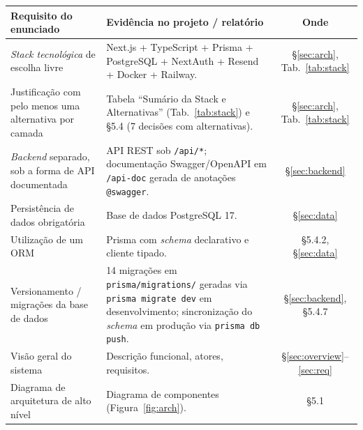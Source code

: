 \documentclass[11pt,a4paper]{article}
\begin{document}
\begin{table}[H]
    \centering
    \footnotesize
    \renewcommand{\arraystretch}{1.3}
    \begin{tabularx}{\linewidth}{@{}p{4.2cm}Xc@{}}
        \toprule
        \textbf{Requisito do enunciado}                         & \textbf{Evidência no projeto / relatório}                                                                              & \textbf{Onde}                          \\
        \midrule
        \emph{Stack tecnológica} de escolha livre               & Next.js + TypeScript + Prisma + PostgreSQL + NextAuth + Resend + Docker + Railway.                                     & \S\ref{sec:arch}, Tab.~\ref{tab:stack} \\
        Justificação com pelo menos uma alternativa por camada  & Tabela ``Sumário da Stack e Alternativas'' (Tab.~\ref{tab:stack}) e \S5.4 (7 decisões com alternativas).               & \S\ref{sec:arch}, Tab.~\ref{tab:stack} \\
        \emph{Backend} separado, sob a forma de API documentada & API REST sob \texttt{/api/*}; documentação Swagger/OpenAPI em \texttt{/api-doc} gerada de anotações \texttt{@swagger}. & \S\ref{sec:backend}                    \\
        Persistência de dados obrigatória                       & Base de dados PostgreSQL 17.                                                                                           & \S\ref{sec:data}                       \\
        Utilização de um ORM                                    & Prisma com \emph{schema} declarativo e cliente tipado.                                                                 & \S5.4.2, \S\ref{sec:data}              \\
        Versionamento / migrações da base de dados              & 14 migrações em \texttt{prisma/migrations/} geradas via \texttt{prisma migrate dev} em desenvolvimento; sincronização do \emph{schema} em produção via \texttt{prisma db push}. & \S\ref{sec:backend}, \S5.4.7      \\
        Visão geral do sistema                                  & Descrição funcional, atores, requisitos.                                                                               & \S\ref{sec:overview}--\ref{sec:req}    \\
        Diagrama de arquitetura de alto nível                   & Diagrama de componentes (Figura~\ref{fig:arch}).                                                                       & \S5.1                                  \\

\end{tabularx}
\end{table}
\end{document}
